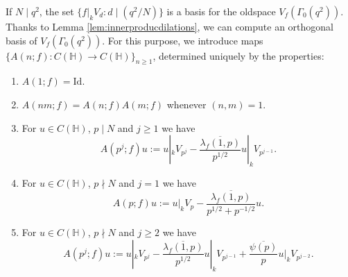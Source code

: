 \documentclass{article}
\theoremstyle{named}
\newcommand{\Hyp}{\mathbb{H}}
\begin{document}
If $N \mid q^2$, the set $\{f|_k V_d : d \mid (q^2/N)\}$ is a basis for the oldspace $V_f(\Gamma_0(q^2))$. Thanks to Lemma \ref{lem:innerproducdilations}, we can compute an orthogonal basis of $V_f(\Gamma_0(q^2))$. For this purpose, we introduce maps $\{A(n; f): C(\Hyp)\rightarrow C(\Hyp)\}_{n \geq 1}$, determined uniquely by the properties:
\begin{enumerate}
    \item [i)] $A(1; f)=  \text{Id}$.
    \item [ii)] $A(nm; f) = A(n; f)A(m; f)$ whenever $(n, m) = 1$.
    \item [iii)] For $u \in C(\Hyp)$, $p \mid N$ and $j \geq 1$ we have
    \begin{equation*}
        A(p^j; f)u := u|_k V_{p^j} - \frac{\overline{\lambda_f(1, p)}}{p^{1/2}}u|_k V_{p^{j-1}}.
    \end{equation*}
    \item [iv)] For  $u \in C(\Hyp)$, $p \nmid N$ and $j = 1$ we have
    \begin{equation*}
        A(p; f)u := u|_k V_p - \frac{\overline{\lambda_f(1, p)}}{p^{1/2} + p^{-1/2}}u.
    \end{equation*}
    \item [v)] For  $u \in C(\Hyp)$, $p \nmid N$ and $j \geq 2$ we have
    \begin{equation*}
        A(p^j; f)u := u|_k V_{p^j} - \frac{\overline{\lambda_f(1, p)}}{p^{1/2}}u|_k V_{p^{j-1}} + \frac{\overline{\psi(p)}}{p}u|_k V_{p^{j-2}}.
    \end{equation*}
\end{enumerate}
\end{document}
